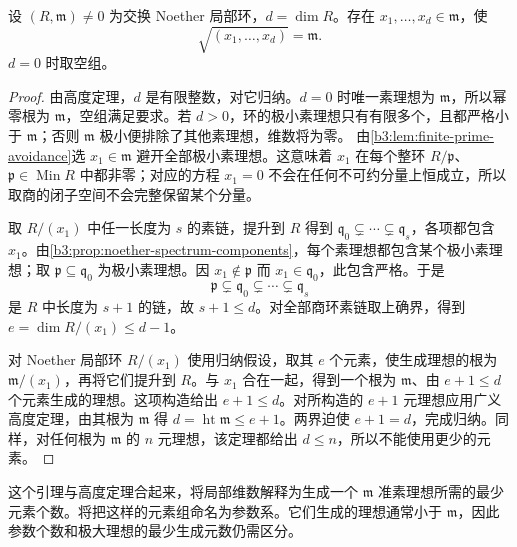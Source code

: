 \begin{lemma}\label{b3:lem:dimension-cutting}
	设 \((R,\mathfrak m)\ne0\) 为交换 Noether 局部环，\(d=\dim R\)。存在 \(x_1,\ldots,x_d\in\mathfrak m\)，使
	\[
		\sqrt{(x_1,\ldots,x_d)}=\mathfrak m.
	\]
	\(d=0\) 时取空组。
\end{lemma}
\begin{proof}
	由高度定理，\(d\) 是有限整数，对它归纳。\(d=0\) 时唯一素理想为 \(\mathfrak m\)，所以幂零根为 \(\mathfrak m\)，空组满足要求。若 \(d>0\)，环的极小素理想只有有限多个，且都严格小于 \(\mathfrak m\)；否则 \(\mathfrak m\) 极小便排除了其他素理想，维数将为零。 由\cref{b3:lem:finite-prime-avoidance}选 \(x_1\in\mathfrak m\) 避开全部极小素理想。这意味着 \(x_1\) 在每个整环 \(R/\mathfrak p\)、\(\mathfrak p\in\operatorname{Min}R\) 中都非零；对应的方程 \(x_1=0\) 不会在任何不可约分量上恒成立，所以取商的闭子空间不会完整保留某个分量。

	取 \(R/(x_1)\) 中任一长度为 \(s\) 的素链，提升到 \(R\) 得到 \(\mathfrak q_0\subsetneq\cdots\subsetneq\mathfrak q_s\)，各项都包含 \(x_1\)。由\cref{b3:prop:noether-spectrum-components}，每个素理想都包含某个极小素理想；取 \(\mathfrak p\subseteq\mathfrak q_0\) 为极小素理想。因 \(x_1\notin\mathfrak p\) 而 \(x_1\in\mathfrak q_0\)，此包含严格。于是
	\[
		\mathfrak p\subsetneq\mathfrak q_0\subsetneq\cdots\subsetneq\mathfrak q_s
	\]
	是 \(R\) 中长度为 \(s+1\) 的链，故 \(s+1\le d\)。对全部商环素链取上确界，得到 \(e=\dim R/(x_1)\le d-1\)。

	对 Noether 局部环 \(R/(x_1)\) 使用归纳假设，取其 \(e\) 个元素，使生成理想的根为 \(\mathfrak m/(x_1)\)，再将它们提升到 \(R\)。与 \(x_1\) 合在一起，得到一个根为 \(\mathfrak m\)、由 \(e+1\le d\) 个元素生成的理想。这项构造给出 \(e+1\le d\)。对所构造的 \(e+1\) 元理想应用广义高度定理，由其根为 \(\mathfrak m\) 得 \(d=\operatorname{ht}\mathfrak m\le e+1\)。两界迫使 \(e+1=d\)，完成归纳。同样，对任何根为 \(\mathfrak m\) 的 \(n\) 元理想，该定理都给出 \(d\le n\)，所以不能使用更少的元素。
\end{proof}

这个引理与高度定理合起来，将局部维数解释为生成一个 \(\mathfrak m\) 准素理想所需的最少元素个数。将把这样的元素组命名为参数系。它们生成的理想通常小于 \(\mathfrak m\)，因此参数个数和极大理想的最少生成元数仍需区分。
